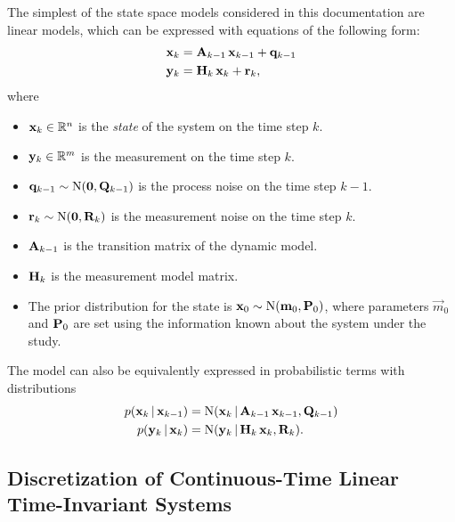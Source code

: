The simplest of the state space models considered in this
documentation are linear models, which can be expressed with equations
of the following form:
%
\begin{equation}
\begin{split} \mathbf{x}_{k} &= \mathbf{A}_{k-1} \, \mathbf{x}_{k-1} +
\mathbf{q}_{k-1} \\ \mathbf{y}_{k} &= \mathbf{H}_{k} \, \mathbf{x}_{k} +
\mathbf{r}_{k},
\end{split}
\label{eq:kalman_model}
\end{equation}
%
where
%
\begin{itemize}
\item $\mathbf{x}_k \in \mathbb{R}^n$ is the {\em state} of the system on
the time step $k$.
%
\item $\mathbf{y}_k \in \mathbb{R}^m$ is the measurement on the time step
$k$.
%
\item $\mathbf{q}_{k-1} \sim \operatorname{N}(\mathbf{0},\mathbf{Q}_{k-1})$ is the process
noise on the time step $k-1$.
%
\item $\mathbf{r}_{k} \sim \operatorname{N}(\mathbf{0},\mathbf{R}_{k})$ is the measurement
noise on the time step $k$.
%
\item $\mathbf{A}_{k-1}$ is the transition matrix of the dynamic model.
%
\item $\mathbf{H}_k$ is the measurement model matrix.
%
\item The prior distribution for the state is $\mathbf{x}_{0} \sim
\operatorname{N}(\mathbf{m}_0,\mathbf{P}_0)$, where parameters $\vec{m}_0$ and $\mathbf{P}_0$
are set using the information known about the system under the study.
%
\end{itemize}

The model can also be equivalently expressed in probabilistic terms
with distributions
%
\begin{equation}
\begin{split} p(\mathbf{x}_{k}\,|\,\mathbf{x}_{k-1}) &=
\operatorname{N}(\mathbf{x}_{k}\,|\,\mathbf{A}_{k-1} \, \mathbf{x}_{k-1}, \mathbf{Q}_{k-1}) \\
p(\mathbf{y}_{k}\,|\,\mathbf{x}_{k}) &= \operatorname{N}(\mathbf{y}_{k}\,|\,\mathbf{H}_{k} \,
\mathbf{x}_{k} , \mathbf{R}_{k}).
\end{split}
\label{eq:kalman_model2}
\end{equation}
 
%
\subsection{Discretization of Continuous-Time Linear Time-Invariant Systems}
%

